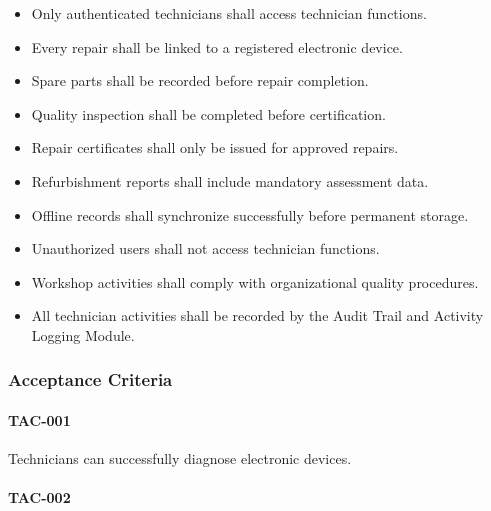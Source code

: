 \begin{itemize}

\item Only authenticated technicians shall access technician functions.

\item Every repair shall be linked to a registered electronic device.

\item Spare parts shall be recorded before repair completion.

\item Quality inspection shall be completed before certification.

\item Repair certificates shall only be issued for approved repairs.

\item Refurbishment reports shall include mandatory assessment data.

\item Offline records shall synchronize successfully before permanent
storage.

\item Unauthorized users shall not access technician functions.

\item Workshop activities shall comply with organizational quality
procedures.

\item All technician activities shall be recorded by the Audit Trail and
Activity Logging Module.

\end{itemize}


\subsubsection*{Acceptance Criteria}

\paragraph{TAC-001}

Technicians can successfully diagnose electronic devices.

\paragraph{TAC-002}

